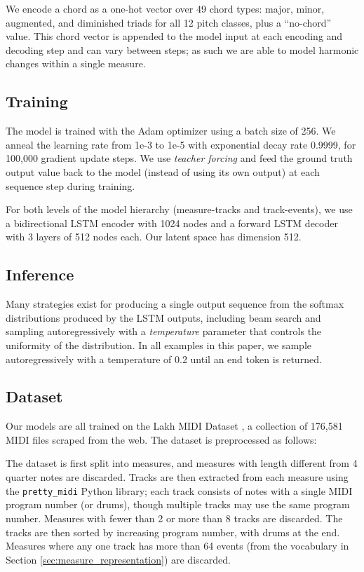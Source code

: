 \documentclass{article}
\begin{document}
We encode a chord as a one-hot vector over 49 chord types: major, minor, augmented, and diminished triads for all 12 pitch classes, plus a ``no-chord'' value.  This chord vector is appended to the model input at each encoding and decoding step and can vary between steps; as such we are able to model harmonic changes within a single measure.

\subsection{Training}

The model is trained with the Adam optimizer \cite{DBLP:journals/corr/KingmaB14} using a batch size of 256. We anneal the learning rate from \mbox{1e-3} to \mbox{1e-5} with exponential decay rate 0.9999, for 100,000 gradient update steps.  We use {\it teacher forcing} and feed the ground truth output value back to the model (instead of using its own output) at each sequence step during training.

For both levels of the model hierarchy (measure-tracks and track-events), we use a bidirectional LSTM encoder with 1024 nodes and a forward LSTM decoder with 3 layers of 512 nodes each. Our latent space has dimension 512.

\subsection{Inference}
\label{subsec:inference}

Many strategies exist for producing a single output sequence from the softmax distributions produced by the LSTM outputs, including beam search and sampling autoregressively with a {\it temperature} parameter that controls the uniformity of the distribution.  In all examples in this paper, we sample autoregressively with a temperature of 0.2 until an end token is returned.

\subsection{Dataset}
Our models are all trained on the Lakh MIDI Dataset \cite{raffel2016learning}, a collection of 176,581 MIDI files scraped from the web.  The dataset is preprocessed as follows:

The dataset is first split into measures, and measures with length different from 4 quarter notes are discarded. Tracks are then extracted from each measure using the \texttt{pretty\_midi} Python library; each track consists of notes with a single MIDI program number (or drums), though multiple tracks may use the same program number.  Measures with fewer than 2 or more than 8 tracks are discarded.  The tracks are then sorted by increasing program number, with drums at the end.  Measures where any one track has more than 64 events (from the vocabulary in Section \ref{sec:measure_representation}) are discarded.
\end{document}
